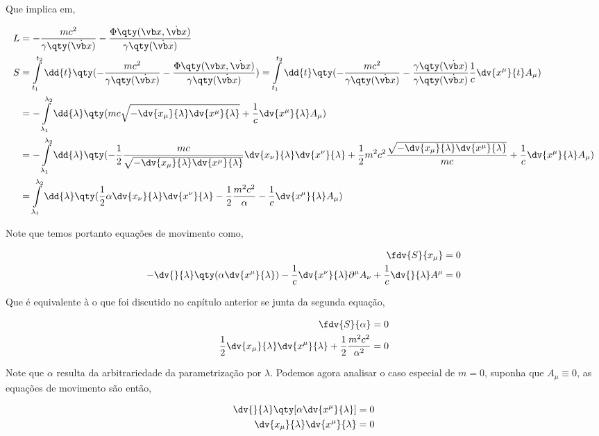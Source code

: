 \documentclass[twoside]{amsart}
\numberwithin{equation}{section}
\begin{document}
\begin{refsection}
Que implica em,

\begin{align}
    L&=-\frac{mc^2}{\gamma\qty(\dot{\vb x})}-\frac{\Phi\qty(\vb x,\dot{\vb x})}{\gamma\qty(\dot{\vb x})}\\
    S&=\int\limits_{t_1}^{t_2}\dd{t}\qty(-\frac{mc^2}{\gamma\qty(\dot{\vb x})}-\frac{\Phi\qty(\vb x,\dot{\vb x})}{\gamma\qty(\dot{\vb x})})=\int\limits_{t_1}^{t_2}\dd{t}\qty(-\frac{mc^2}{\gamma\qty(\dot{\vb x})}-\frac{\gamma\qty(\dot{\vb x})}{\gamma\qty(\dot{\vb x})}\frac1c\dv{x^\mu}{t}A_\mu)\\
    &=-\int\limits_{\lambda_1}^{\lambda_2}\dd{\lambda}\qty(mc\sqrt{-\dv{x_\mu}{\lambda}\dv{x^\mu}{\lambda}}+\frac1c\dv{x^\mu}{\lambda}A_\mu)\\
    &=-\int\limits_{\lambda_1}^{\lambda_2}\dd{\lambda}\qty(-\frac12\frac{mc}{\sqrt{-\dv{x_\mu}{\lambda}\dv{x^\mu}{\lambda}}}\dv{x_\nu}{\lambda}\dv{x^\nu}{\lambda}+\frac12 m^2c^2\frac{\sqrt{-\dv{x_\mu}{\lambda}\dv{x^\mu}{\lambda}}}{mc}+\frac1c\dv{x^\mu}{\lambda}A_\mu)\\
    &=\int\limits_{\lambda_1}^{\lambda_2}\dd{\lambda}\qty(\frac12\alpha\dv{x_\nu}{\lambda}\dv{x^\nu}{\lambda}-\frac12 \frac{m^2c^2}{\alpha}-\frac1c\dv{x^\mu}{\lambda}A_\mu)
\end{align}

Note que temos portanto equações de movimento como,

\begin{align}
    \fdv{S}{x_\mu}&=0\\
    -\dv{}{\lambda}\qty(\alpha\dv{x^\mu}{\lambda})-\frac1c\dv{x^\nu}{\lambda}\partial^\mu A_\nu+\frac1c\dv{}{\lambda}A^\mu&=0
\end{align}

Que é equivalente à o que foi discutido no capítulo anterior se junta da segunda equação,

\begin{align}
    \fdv{S}{\alpha}&=0\\
    \frac12\dv{x_\mu}{\lambda}\dv{x^\mu}{\lambda}+\frac12\frac{m^2c^2}{\alpha^2}&=0
\end{align}

Note que $\alpha$ resulta da arbitrariedade da parametrização por $\lambda$. Podemos agora analisar o caso especial de $m=0$, suponha que $A_\mu\equiv 0$, as equações de movimento são então,

\begin{align}
    \dv{}{\lambda}\qty[\alpha\dv{x^\mu}{\lambda}]&=0\\
    \dv{x_\mu}{\lambda}\dv{x^\mu}{\lambda}&=0
\end{align}


\end{refsection}
\end{document}
